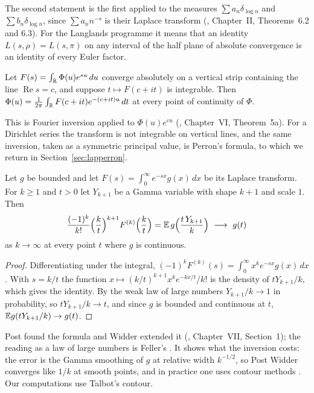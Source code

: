 The second statement is the first applied to the measures $\sum a_n\delta_{\log n}$ and $\sum b_n\delta_{\log n}$, since $\sum a_nn^{-s}$ is their Laplace transform (\cite{widder1941}, Chapter~II, Theorems~6.2 and 6.3). For the Langlands programme it means that an identity $L(s,\rho)=L(s,\pi)$ on any interval of the half plane of absolute convergence is an identity of every Euler factor.

\begin{theorem}[Bromwich]\label{thm:lapbromwich}
Let $F(s)=\int_{\mathbb{R}}\Phi(u)e^{su}\,du$ converge absolutely on a vertical strip containing the line $\operatorname{Re}s=c$, and suppose $t\mapsto F(c+it)$ is integrable. Then $\Phi(u)=\frac1{2\pi}\int_{\mathbb{R}}F(c+it)e^{-(c+it)u}\,dt$ at every point of continuity of $\Phi$.
\end{theorem}

This is Fourier inversion applied to $\Phi(u)e^{cu}$ (\cite{widder1941}, Chapter~VI, Theorem~5a). For a Dirichlet series the transform is not integrable on vertical lines, and the same inversion, taken as a symmetric principal value, is Perron's formula, to which we return in Section~\ref{sec:lapperron}.

\begin{theorem}\label{thm:lappostwidder}
Let $g$ be bounded and let $F(s)=\int_0^\infty e^{-sx}g(x)\,dx$ be its Laplace transform. For $k\ge1$ and $t>0$ let $Y_{k+1}$ be a Gamma variable with shape $k+1$ and scale $1$. Then
\[
\frac{(-1)^k}{k!}\Bigl(\frac kt\Bigr)^{k+1}F^{(k)}\Bigl(\frac kt\Bigr)=\E\,g\Bigl(\frac{t\,Y_{k+1}}k\Bigr)\ \longrightarrow\ g(t)
\]
as $k\to\infty$ at every point $t$ where $g$ is continuous.
\end{theorem}

\begin{proof}
Differentiating under the integral, $(-1)^kF^{(k)}(s)=\int_0^\infty x^ke^{-sx}g(x)\,dx$. With $s=k/t$ the function $x\mapsto(k/t)^{k+1}x^ke^{-kx/t}/k!$ is the density of $tY_{k+1}/k$, which gives the identity. By the weak law of large numbers $Y_{k+1}/k\to1$ in probability, so $tY_{k+1}/k\to t$, and since $g$ is bounded and continuous at $t$, $\mathbb{E} g(tY_{k+1}/k)\to g(t)$.
\end{proof}

Post found the formula and Widder extended it (\cite{widder1941}, Chapter~VII, Section~1); the reading as a law of large numbers is Feller's \cite{feller1971}. It shows what the inversion costs: the error is the Gamma smoothing of $g$ at relative width $k^{-1/2}$, so Post Widder converges like $1/k$ at smooth points, and in practice one uses contour methods \cite{talbot1979,abatewhitt2006}. Our computations use Talbot's contour.

